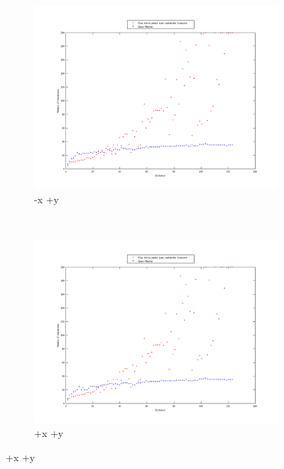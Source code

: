 \documentclass[11pt,a4paper,twoside,onecolumn,titlepage]{report}
\begin{document}
\begin{enumerate}[(a)]
\begin{figure}[h!]
    \centering
	\begin{subfigure}[t]{0.5\textwidth}
		\centering
		\includegraphics[scale=0.4]{methods-quarter-4}
		\caption{-x +y}
		\label{fig:awesome_image}
	\end{subfigure}%
        ~ %
    \begin{subfigure}[t]{0.5\textwidth}
		\centering
		\includegraphics[scale=0.4]{methods-quarter-3}
		\caption{+x +y}
		\label{fig:awesome_image}
	\end{subfigure}


\end{figure}
\end{enumerate}
\end{document}
